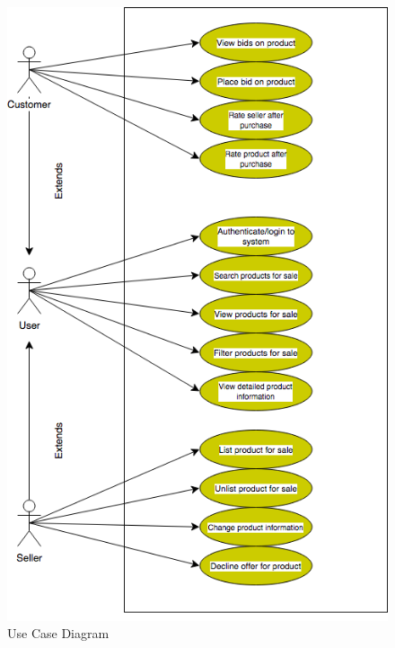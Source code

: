
\begin{figure}[H]
  \caption{Use Case Diagram}
  \centering
    \includegraphics[scale=0.8]{figures/Use-Case}
\end{figure}


